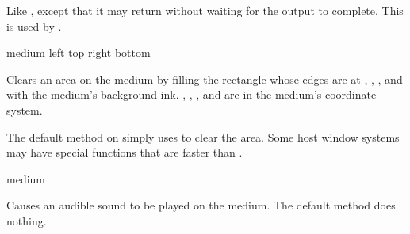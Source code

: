 Like , except that it may return  without
waiting for the output to complete.  This is used by .

 {medium left top right bottom}

Clears an area on the {medium}  by filling the rectangle whose edges
are at , , , and  with the medium's
background ink.  , , , and  are in
the medium's coordinate system.

The default method on  simply uses  to
clear the area.  Some host window systems may have special functions that are faster
than .

 {medium}

Causes an audible sound to be played on the medium.  The default method
does nothing.
